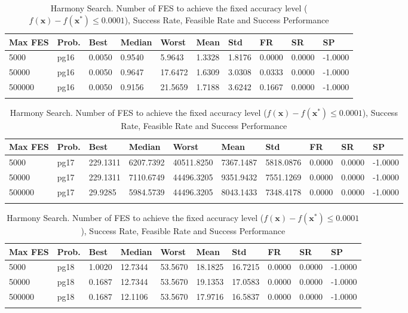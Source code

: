 \documentclass[10pt, a4paper]{book}
\begin{document}
\begin{center}
\begin{longtable}{l l l l l l l l l l}
\textbf{Max FES} & \textbf{Prob.} & \textbf{Best} & \textbf{Median} & \textbf{Worst} & \textbf{Mean} & \textbf{Std} & \textbf{FR} & \textbf{SR} & \textbf{SP} \\
\hline
5000 & pg16 & 0.0050 & 0.9540 & 5.9643 & 1.3328 & 1.8176 & 0.0000 & 0.0000 & -1.0000 \\
50000 & pg16 & 0.0050 & 0.9647 & 17.6472 & 1.6309 & 3.0308 & 0.0333 & 0.0000 & -1.0000 \\
500000 & pg16 & 0.0050 & 0.9156 & 21.5659 & 1.7188 & 3.6242 & 0.1667 & 0.0000 & -1.0000 \\

\caption{ Harmony Search. Number of FES to achieve the fixed accuracy level ($f(\mathbf{x}) - f(\mathbf{x}^{*}) \leq 0.0001$), Success Rate, Feasible Rate and Success Performance }
\end{longtable}
\end{center}

\begin{center}
\begin{longtable}{l l l l l l l l l l}
\textbf{Max FES} & \textbf{Prob.} & \textbf{Best} & \textbf{Median} & \textbf{Worst} & \textbf{Mean} & \textbf{Std} & \textbf{FR} & \textbf{SR} & \textbf{SP} \\
\hline
5000 & pg17 & 229.1311 & 6207.7392 & 40511.8250 & 7367.1487 & 5818.0876 & 0.0000 & 0.0000 & -1.0000 \\
50000 & pg17 & 229.1311 & 7110.6749 & 44496.3205 & 9351.9432 & 7551.1269 & 0.0000 & 0.0000 & -1.0000 \\
500000 & pg17 & 29.9285 & 5984.5739 & 44496.3205 & 8043.1433 & 7348.4178 & 0.0000 & 0.0000 & -1.0000 \\

\caption{ Harmony Search. Number of FES to achieve the fixed accuracy level ($f(\mathbf{x}) - f(\mathbf{x}^{*}) \leq 0.0001$), Success Rate, Feasible Rate and Success Performance }
\end{longtable}
\end{center}

\begin{center}
\begin{longtable}{l l l l l l l l l l}
\textbf{Max FES} & \textbf{Prob.} & \textbf{Best} & \textbf{Median} & \textbf{Worst} & \textbf{Mean} & \textbf{Std} & \textbf{FR} & \textbf{SR} & \textbf{SP} \\
\hline
5000 & pg18 & 1.0020 & 12.7344 & 53.5670 & 18.1825 & 16.7215 & 0.0000 & 0.0000 & -1.0000 \\
50000 & pg18 & 0.1687 & 12.7344 & 53.5670 & 19.1353 & 17.0583 & 0.0000 & 0.0000 & -1.0000 \\
500000 & pg18 & 0.1687 & 12.1106 & 53.5670 & 17.9716 & 16.5837 & 0.0000 & 0.0000 & -1.0000 \\

\caption{ Harmony Search. Number of FES to achieve the fixed accuracy level ($f(\mathbf{x}) - f(\mathbf{x}^{*}) \leq 0.0001$), Success Rate, Feasible Rate and Success Performance }
\end{longtable}
\end{center}
\end{document}
